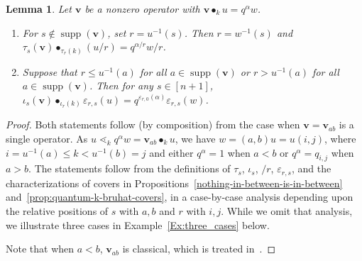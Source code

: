 \documentclass[11pt]{article}
\newtheorem{lemma}[theo]{Lemma}
\theoremstyle{definition}
\numberwithin{equation}{section}
\newcommand{\qv}{{\mathbf v}}
\DeclareMathOperator{\supp}{supp}
\DeclareMathOperator{\kactionop}{{\scriptstyle \bullet}}
\newcommand{\kaction}[1][k]{\kactionop_{#1}}
\begin{document}
\begin{lemma}\label{L:relative-labels}
  Let $\qv$ be a nonzero operator with $\qv\kaction u=q^\alpha w$.
  \begin{enumerate}[label=(\roman*)]
  \item\label{L:r-l:i}
    For $s\not\in\supp(\qv)$, set $r=u^{-1}(s)$.
    Then $r=w^{-1}(s)$ and $\tau_s(\qv) {\kactionop}_{\tau_r(k)} (u/r) = q^{\alpha/r} w/r$.
  \item \label{L:r-l:ii}
    Suppose that $r\leq u^{-1}(a)$ for all $a\in\supp(\qv)$ or $r>u^{-1}(a)$ for all $a\in\supp(\qv)$.
    Then for any $s\in[n{+}1]$, $\iota_s(\qv)\kactionop_{\iota_r(k)} \varepsilon_{r,s}(u) = q^{\varepsilon_{r,0}(\alpha)}\varepsilon_{r,s}(w)$.
  \end{enumerate}
\end{lemma}

\begin{proof}
  Both statements follow (by composition) from the case when $\qv=\qv_{ab}$ is a single operator.
  As $u\lessdot_k q^\alpha w=\qv_{ab}\kaction u$, we have
  $w=(a,b)u=u(i,j)$, where $i=u^{-1}(a)\leq k < u^{-1}(b)=j$ and either $q^\alpha=1$ when $a<b$ or $q^\alpha=q_{i,j}$ when $a>b$.
  The statements follow from the definitions of $\tau_s$, $\iota_s$, $/r$, $\varepsilon_{r,s}$, and the
  characterizations of covers in Propositions~\ref{nothing-in-between-is-in-between} and~\ref{prop:quantum-k-bruhat-covers}, in a
  case-by-case analysis depending upon the relative positions of $s$ with $a,b$ and $r$ with $i,j$.
  While we omit that analysis, we illustrate three cases in Example~\ref{Ex:three_cases} below.

  Note that when $a<b$, $\qv_{ab}$ is classical, which is treated in~\cite{BS-Bruhat,BS-Monoid}.
\end{proof}
\end{document}
